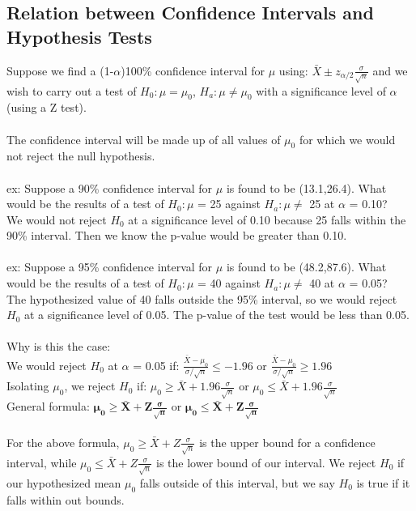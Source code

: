 \documentclass[12pt, a4paper]{article}
\begin{document}
	\subsection{Relation between Confidence Intervals and Hypothesis Tests}
	Suppose we find a (1-$\alpha$)100\% confidence interval for $\mu$ using: $\bar{X} \pm z_{\alpha/2}\frac{\sigma}{\sqrt{n}}$ and we wish to carry out a test of $H_0: \mu = \mu_0$, $H_a: \mu \neq \mu_0$ with a significance level of $\alpha$ (using a Z test). \\~\\
	The confidence interval will be made up of all values of $\mu_0$ for which we would not reject the null hypothesis. \\~\\
	ex: Suppose a 90\% confidence interval for $\mu$ is found to be (13.1,26.4). What would be the results of a test of $H_0: \mu$ = 25 against $H_a: \mu \neq$ 25 at $\alpha$ = 0.10? \\
	We would not reject $H_0$ at a significance level of 0.10 because 25 falls within the 90\% interval. Then we know the p-value would be greater than 0.10. \\~\\
	ex: Suppose a 95\% confidence interval for $\mu$ is found to be (48.2,87.6). What would be the results of a test of $H_0: \mu$ = 40 against $H_a: \mu \neq$ 40 at $\alpha$ = 0.05? \\
	The hypothesized value of 40 falls outside the 95\% interval, so we would reject $H_0$ at a significance level of 0.05. The p-value of the test would be less than 0.05. \\~\\
	Why is this the case: \\
	We would reject $H_0$ at $\alpha$ = 0.05 if: $\frac{\bar{X} - \mu_0}{\sigma/\sqrt{n}} \leq -1.96$ or $\frac{\bar{X} - \mu_0}{\sigma/\sqrt{n}} \geq 1.96$ \\
	Isolating $\mu_0$, we reject $H_0$ if: $\mu_0 \geq \bar{X} + 1.96\frac{\sigma}{\sqrt{n}}$ or $\mu_0 \leq \bar{X} + 1.96\frac{\sigma}{\sqrt{n}}$ \\
	General formula: \large $\bm{\mu_0 \geq \bar{X} + Z\frac{\sigma}{\sqrt{n}}}$ or $\bm{\mu_0 \leq \bar{X} + Z\frac{\sigma}{\sqrt{n}}}$ \normalsize \\~\\
	For the above formula, $\mu_0 \geq \bar{X} + Z\frac{\sigma}{\sqrt{n}}$ is the upper bound for a confidence interval, while $\mu_0 \leq \bar{X} + Z\frac{\sigma}{\sqrt{n}}$ is the lower bound of our interval. We reject $H_0$ if our hypothesized mean $\mu_0$ falls outside of this interval, but we say $H_0$ is true if it falls within out bounds. \newpage
	
\end{document}
